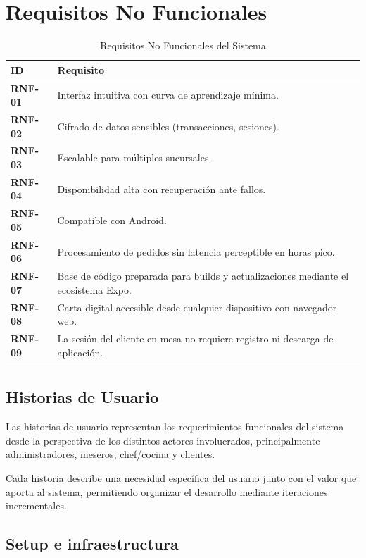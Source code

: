 \section{Requisitos No Funcionales}

\begin{longtable}{>{\bfseries}p{2cm} p{11cm}}
  \toprule
  \textbf{ID} & \textbf{Requisito} \\
  \midrule
  \endhead
  RNF-01 & Interfaz intuitiva con curva de aprendizaje mínima. \\[3pt]
  RNF-02 & Cifrado de datos sensibles (transacciones, sesiones). \\[3pt]
  RNF-03 & Escalable para múltiples sucursales. \\[3pt]
  RNF-04 & Disponibilidad alta con recuperación ante fallos. \\[3pt]
  RNF-05 & Compatible con Android. \\[3pt]
  RNF-06 & Procesamiento de pedidos sin latencia perceptible en horas pico. \\[3pt]
  RNF-07 & Base de código preparada para builds y actualizaciones mediante el ecosistema Expo. \\[3pt]
  RNF-08 & Carta digital accesible desde cualquier dispositivo con navegador web. \\[3pt]
  RNF-09 & La sesión del cliente en mesa no requiere registro ni descarga de aplicación. \\
  \bottomrule
  \caption{Requisitos No Funcionales del Sistema}
\end{longtable}

\subsection{Historias de Usuario}

Las historias de usuario representan los requerimientos funcionales del sistema
desde la perspectiva de los distintos actores involucrados, principalmente
administradores, meseros, chef/cocina y clientes.

Cada historia describe una necesidad específica del usuario junto con el valor
que aporta al sistema, permitiendo organizar el desarrollo mediante iteraciones
incrementales.


\subsection{Setup e infraestructura}

